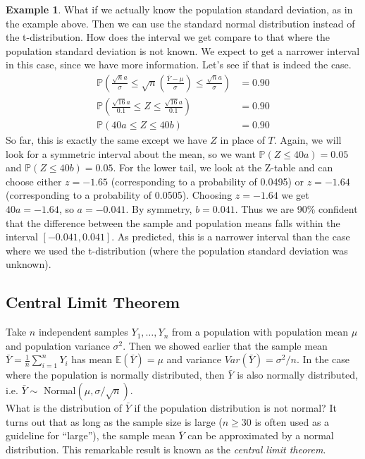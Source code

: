 \documentclass[12pt]{article}
\theoremstyle{definition}
\newtheorem*{example}{Example}
\theoremstyle{remark}
\def\P{{\mathbb P}}
\def\E{{\mathbb E}}
\begin{document}
\begin{example}
What if we actually know the population standard deviation, as in the example above. Then we can use the standard normal distribution instead of the t-distribution. How does the interval we get compare to that where the population standard deviation is not known. We expect to get a narrower interval in this case, since we have more information. Let's see if that is indeed the case. 
\begin{align*}
\P\left( \frac{\sqrt{n}a}{\sigma} \leq \sqrt{n} \left(\frac{\bar{Y} - \mu}{ \sigma }\right) \leq \frac{\sqrt{n}a}{\sigma} \right) &= 0.90\\
\P\left( \frac{\sqrt{16}a}{0.1} \leq Z \leq \frac{\sqrt{16}a}{0.1} \right) &= 0.90 \\
\P\left( 40a \leq Z \leq 40b  \right) &= 0.90 
\end{align*}
So far, this is exactly the same except we have $Z$ in place of $T$. Again, we will look for a symmetric interval about the mean, so we want $\P(Z \leq 40a) = 0.05$ and $\P(Z \leq 40b) = 0.05$. For the lower tail, we look at the Z-table and can choose either $z = -1.65$ (corresponding to a probability of 0.0495) or $z = -1.64$ (corresponding to a probability of 0.0505). Choosing $z = -1.64$ we get $40a = -1.64$, so $a = -0.041$. By symmetry, $b = 0.041$. Thus we are 90\% confident that the difference between the sample and population means falls within the interval $[-0.041, 0.041]$. As predicted, this is a narrower interval than the case where we used the t-distribution (where the population standard deviation was unknown).
\end{example}

\subsection{Central Limit Theorem}

Take $n$ independent samples $Y_1, \dots, Y_n$ from a population with population mean $\mu$ and population variance $\sigma^2$. Then we showed earlier that the sample mean $\bar{Y} = \frac{1}{n}\sum_{i=1}^n Y_i$ has mean $\E(\bar{Y}) = \mu$ and variance $Var(\bar{Y}) = \sigma^2 / n$. In the case where the population is normally distributed, then $\bar{Y}$ is also normally distributed, i.e. $\bar{Y} \sim$ Normal$(\mu, \sigma/\sqrt{n})$. \\

What is the distribution of $\bar{Y}$ if the population distribution is not normal? It turns out that as long as the sample size is large ($n \geq 30$ is often used as a guideline for ``large''), the sample mean $\bar{Y}$ can be approximated by a normal distribution. This remarkable result is known as the \emph{central limit theorem}.
\end{document}
